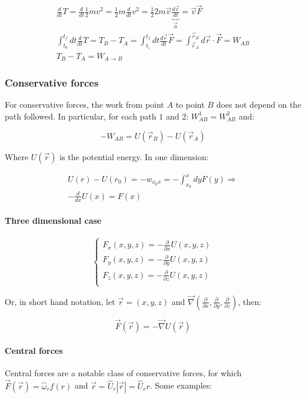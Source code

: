  \begin{align*}
    \frac{d{}}{d{t}}T = \frac{d{}}{d{t}}\frac{1}{2}mv^2 = \frac{1}{2}m \frac{d{}}{d{t}}v^2 = \frac{1}{2}2m \vec{v}\underbrace{\frac{d{\vec{v}}}{d{t}}}_{\vec{a}} = \vec{v} \vec{F}\\
    \int_{t_0}^{t_f}dt \frac{d{}}{d{t}}T = T_B-T_A = \int_{t_i}^{t_f}dt \frac{d{\vec{r}}}{d{t}}\vec{F} = \int_{\vec{r}_A}^{\vec{r}_B} d \vec{r}\cdot \vec{F} = W_{AB}\\
    T_B-T_A = W_{A\rightarrow B}
  \end{align*}

    \subsubsection{Conservative forces}
    For conservative forces, the work from point $A$ to point $B$ does not depend on the path followed. In particular, for each path $1$ and $2$: $W_{AB}^1 = W_{AB}^2$ and:

    $$-W_{AB} = U(\vec{r}_B) - U(\vec{r}_A)$$

    Where $U(\vec{r})$ is the potential energy.
    In one dimension:

    \begin{align*}
      U(r) -U(r_0) = -w_{x_0x} = -\int_{x_0}^xdyF(y) \Rightarrow\\
      -\frac{d{}}{d{x}}U(x) = F(x)
    \end{align*}

      \paragraph{Three dimensional case}

      $$\begin{cases}
        F_x(x,y,z) = - \frac{\partial {}}{\partial {x}}U(x,y,z)\\
        F_y(x,y,z) = - \frac{\partial {}}{\partial {y}}U(x,y,z)\\
        F_z(x,y,z) = - \frac{\partial {}}{\partial {z}}U(x,y,z)\\
      \end{cases}$$

      Or, in short hand notation, let $\vec{r}=(x,y,z)$ and $\vec{\nabla}(\frac{\partial {}}{\partial {x}},\frac{\partial {}}{\partial {y}},\frac{\partial {}}{\partial {z}})$, then:

      $$\vec{F}(\vec{r}) = -\vec{\nabla}U(\vec{r})$$

      \paragraph{Central forces}
      Central forces are a notable class of conservative forces, for which $\vec{F}(\vec{r}) = \hat{\omega}_{r}f(r)$ and $\vec{r} = \hat{U}_{r}|\vec{r}| = \hat{U}_{r}r$.
      Some examples:

